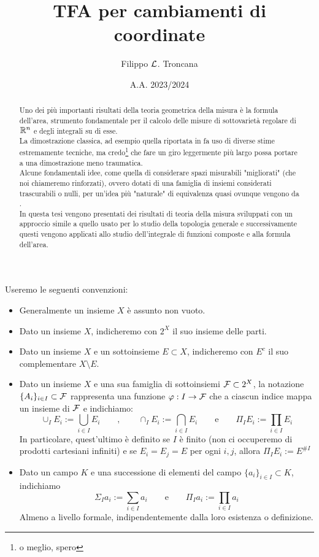 \documentclass{article}
\title{TFA per cambiamenti di coordinate}
\author{Filippo $\mathcal{L}$. Troncana}
\date{A.A. 2023/2024}
\renewcommand\F{\mc{F}}
\begin{document}
\maketitle

\begin{abstract}
    Uno dei più importanti risultati della teoria geometrica della misura è la formula dell'area, strumento fondamentale per il calcolo delle misure di sottovarietà regolare di $\mathbb{R}^n$ e degli integrali su di esse.\\
    La dimostrazione classica, ad esempio quella riportata in \cite{EvansGariepy1991} fa uso di diverse stime estremamente tecniche, ma credo\footnote{o meglio, spero} che fare un giro leggermente più largo possa portare a una dimostrazione meno traumatica.\\
    Alcune fondamentali idee, come quella di considerare spazi misurabili "migliorati" (che noi chiameremo rinforzati), ovvero dotati di una famiglia di insiemi considerati trascurabili o nulli, per un'idea più "naturale" di equivalenza quasi ovunque vengono da \cite{Fremlin2000}.\\
    In questa tesi vengono presentati dei risultati di teoria della misura sviluppati con un approccio simile a quello usato per lo studio della topologia generale e successivamente questi vengono applicati allo studio dell'integrale di funzioni composte e alla formula dell'area.
\end{abstract}

\tableofcontents

\begin{notation}
    Useremo le seguenti convenzioni:\begin{itemize}
        \item Generalmente un insieme $X$ è assunto non vuoto.
        \item Dato un insieme $X$, indicheremo con $2^X$ il suo insieme delle parti.
        \item Dato un insieme $X$ e un sottoinsieme $E\subset X$, indicheremo con $E^c$ il suo complementare $X\setminus E$.
        \item Dato un insieme $X$ e una sua famiglia di sottoinsiemi $\F \subset 2^X$, la notazione $\{A_i\}_{i \in I} \subset \F$ rappresenta una funzione $\varphi: I \to \F$ che a ciascun indice mappa un insieme di $\F$ e indichiamo:
        \[\cup_I E_i := \bigcup_{i \in I} E_i \qquad, \qquad \cap_I E_i := \bigcap_{i \in I} E_i \qquad \text{e}\qquad \Pi_I E_i := \prod_{i \in I} E_i \]
        In particolare, quest'ultimo è definito se $I$ è finito (non ci occuperemo di prodotti cartesiani infiniti) e se $E_i = E_j= E $ per ogni $i,j$, allora $\Pi_I E_i := E^{\# I}$
        \item Dato un campo $K$ e una successione di elementi del campo $\{a_i\}_{i \in I}\subset K$, indichiamo
        \[\Sigma_I a_i := \sum_{i \in I} a_i \qquad\text{e} \qquad \Pi_I a_i := \prod_{i \in I} a_i \]
        Almeno a livello formale, indipendentemente dalla loro esistenza o definizione.
    \end{itemize}
\end{notation}
\end{document}
